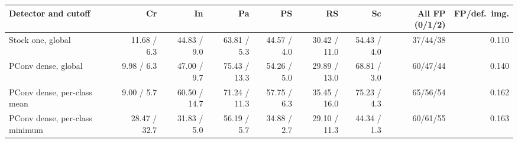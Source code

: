 \begin{tabular}{lrrrrrrrr}\hline
Detector and cutoff & Cr & In & Pa & PS & RS & Sc & All FP (0/1/2) & FP/def.\ img. \\ \hline
Stock one, global & 11.68 / 6.3 & 44.83 / 9.0 & 63.81 / 5.3 & 44.57 / 4.0 & 30.42 / 11.0 & 54.43 / 4.0 & 37/44/38 & 0.110 \\
PConv dense, global & 9.98 / 6.3 & 47.00 / 9.7 & 75.43 / 13.3 & 54.26 / 5.0 & 29.89 / 13.0 & 68.81 / 3.0 & 60/47/44 & 0.140 \\
PConv dense, per-class mean & 9.00 / 5.7 & 60.50 / 14.7 & 71.24 / 11.3 & 57.75 / 6.3 & 35.45 / 16.0 & 75.23 / 4.3 & 65/56/54 & 0.162 \\
PConv dense, per-class minimum & 28.47 / 32.7 & 31.83 / 5.0 & 56.19 / 5.7 & 34.88 / 2.7 & 29.10 / 11.3 & 44.34 / 1.3 & 60/61/55 & 0.163 \\
\hline\end{tabular}
